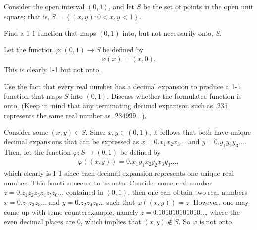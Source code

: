 \documentclass[12pt]{article}
\newenvironment{problem}[2][Problem]{\begin{trivlist}
		\item[\hskip \labelsep {\bfseries #1}\hskip \labelsep {\bfseries #2.}]}{\end{trivlist}}
\newenvironment{solution}[2][Solution]{\begin{trivlist}
		\item[\hskip \labelsep {\bfseries #1}\hskip \labelsep {\bfseries #2.}]}{\end{trivlist}}
\begin{document}
\begin{problem}{1.5.7}
  Consider the open interval $(0,1)$, and let $S$ be the set of points in the open unit square; that is, $S=\left\{ (x,y):0<x,y<1 \right\}$.
  \begin{enumerate}
    \item Find a 1-1 function that maps $(0,1)$ into, but not necessarily onto, $S$. 
      \begin{solution}{(a)}
	Let the function $\varphi: (0,1) \to S$ be defined by
	\begin{align*}
	  \varphi(x) = (x,0).
	\end{align*}
	This is clearly 1-1 but not onto. 
      \end{solution}
    \item Use the fact that every real number has a decimal expansion to produce a 1-1 function that maps $S$ into $(0,1)$. Discuss whether the formulated function is onto. (Keep in mind that any terminating decimal expanison such as $.235$ represents the same real number as $.234999\dots$).
      \begin{solution}{(b)}
	Consider some $(x,y)\in S$. Since $x,y\in(0,1)$, it follows that both have unique decimal expansions that can be expressed as $x=0.x_{1}x_{2}x_{3}\dots$ and $y=0.y_{1}y_{2}y_{3}\dots$. Then, let the function $\varphi:S\to (0,1)$ be defined by
	\begin{align*}
    \varphi((x,y))  = 
      0.x_{1}y_{1}x_{2}y_{2}x_{3}y_{3}\dots,
	\end{align*}
	which clearly is 1-1 since each decimal expansion represents one unique real number. This function seems to be onto. Consider some real number $z=0.z_{1}z_{2}z_{3}z_{4}z_{5}z_{6}\dots$ contained in $(0,1)$, then one can obtain two real numbers $x=0.z_{1}z_{3}z_{5}\dots$ and $y=0.z_{2}z_{4}z_{6}\dots$ such that $\varphi\left((x,y)\right) = z$.  However, one may come up with some counterexample, namely $z=0.101010101010\dots$, where the even decimal places are 0, which implies that $(x,y) \not\in S$. So $\varphi$ is not onto. 
      \end{solution}
  \end{enumerate}
\end{problem}
\end{document}
